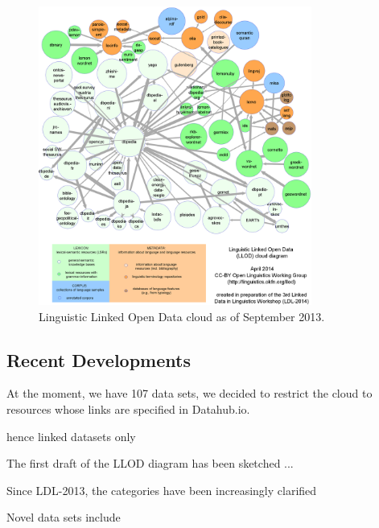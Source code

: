 
\begin{figure}[t]
 \begin{center}
 \includegraphics[width=0.8\textwidth]{llod-colored.png}
 \end{center}
\caption{Linguistic Linked Open Data cloud as of September 2013.}
\label{figI18nLOD}
\end{figure}

\subsection{Recent Developments}


At the moment, we have 107 data sets, we decided to restrict the cloud to resources whose links are specified in Datahub.io.

hence linked datasets only


The first draft of the LLOD diagram has been sketched ...

Since LDL-2013, the categories have been increasingly clarified

Novel data sets include

